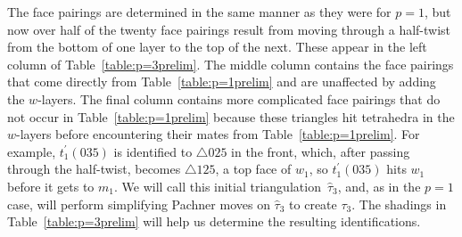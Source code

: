 \documentclass[reqno]{amsart}
\theoremstyle{plain}
\theoremstyle{definition}
\begin{document}
The face pairings are determined in the same manner as they were for $p=1$, but now over half of the twenty face pairings result from moving through a half-twist from the bottom of one layer to the top of the next.  These appear in the left column of Table~\ref{table:p=3prelim}.  The middle column contains the face pairings that come directly from Table~\ref{table:p=1prelim}  and are unaffected by adding the $w$-layers.  The final column contains more complicated face pairings that do not occur in Table~\ref{table:p=1prelim} because these triangles hit tetrahedra in the $w$-layers before encountering their mates  from Table~\ref{table:p=1prelim}.  For example,  $t_1^\prime(035)$ is identified to $\triangle 025$ in the front, which, after passing through the half-twist, becomes $\triangle 125$, a top face of $w_1$, so $t_1^\prime(035)$ hits  $w_1$ before it gets to $m_1$.  We will call this initial triangulation~$\hat{\tau}_3$, and, as in the $p=1$ case, will perform simplifying Pachner moves on $\hat{\tau}_3$ to create $\tau_{3}$.  The shadings in Table~\ref{table:p=3prelim} will help us determine the resulting identifications.
\end{document}
